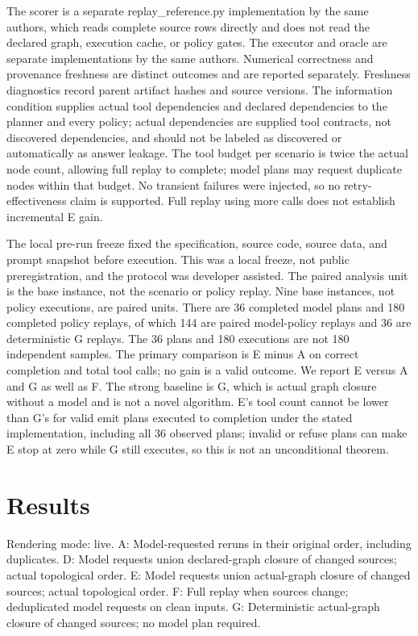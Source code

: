 \documentclass{article}
\begin{document}
The scorer is a separate replay\_reference.py implementation by the same authors, which reads complete source rows directly and does not read the declared graph, execution cache, or policy gates. The executor and oracle are separate implementations by the same authors. Numerical correctness and provenance freshness are distinct outcomes and are reported separately. Freshness diagnostics record parent artifact hashes and source versions. The information condition supplies actual tool dependencies and declared dependencies to the planner and every policy; actual dependencies are supplied tool contracts, not discovered dependencies, and should not be labeled as discovered or automatically as answer leakage. The tool budget per scenario is twice the actual node count, allowing full replay to complete; model plans may request duplicate nodes within that budget. No transient failures were injected, so no retry-effectiveness claim is supported. Full replay using more calls does not establish incremental E gain.

The local pre-run freeze fixed the specification, source code, source data, and prompt snapshot before execution. This was a local freeze, not public preregistration, and the protocol was developer assisted. The paired analysis unit is the base instance, not the scenario or policy replay. Nine base instances, not policy executions, are paired units. There are 36 completed model plans and 180 completed policy replays, of which 144 are paired model-policy replays and 36 are deterministic G replays. The 36 plans and 180 executions are not 180 independent samples. The primary comparison is E minus A on correct completion and total tool calls; no gain is a valid outcome. We report E versus A and G as well as F. The strong baseline is G, which is actual graph closure without a model and is not a novel algorithm. E's tool count cannot be lower than G's for valid emit plans executed to completion under the stated implementation, including all 36 observed plans; invalid or refuse plans can make E stop at zero while G still executes, so this is not an unconditional theorem.

\section{Results}

Rendering mode: live. A: Model-requested reruns in their original order, including duplicates. D: Model requests union declared-graph closure of changed sources; actual topological order. E: Model requests union actual-graph closure of changed sources; actual topological order. F: Full replay when sources change; deduplicated model requests on clean inputs. G: Deterministic actual-graph closure of changed sources; no model plan required.
\end{document}
